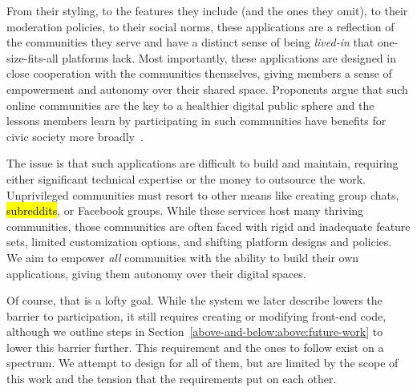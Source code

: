 
%
From their styling, to the features they include (and the ones they omit),
to their moderation policies, to their social norms, these applications
are a reflection of the communities they serve and have a
distinct sense of being \emph{lived-in}
that one-size-fits-all platforms lack.
Most importantly, these applications are designed in close cooperation with the communities themselves,
giving members a sense of empowerment and autonomy over their shared space.
Proponents argue that such online communities are the key to a healthier
digital public sphere and the lessons members learn by participating in such
communities have benefits for civic society more broadly~\cite{threeleggedstool, runyourownsocial, archiveoftheirown}.

The issue is that such applications are difficult to build and maintain,
requiring either significant technical expertise or the money to outsource the work.
Unprivileged communities must resort to other means like creating group chats,
\hl{subreddits}, or Facebook groups. %
While these services host many thriving communities,
those communities are often faced with rigid and inadequate feature sets,
limited customization options, and shifting platform designs and policies.
We aim to empower \emph{all} communities with the ability to
build their own applications, giving them autonomy over their digital spaces.

Of course, that is a lofty goal. While the system
we later describe lowers the barrier to participation,
it still requires creating or modifying front-end code, although
we outline steps in Section~\ref{above-and-below:above:future-work}
to lower this barrier further.
This requirement and the ones to follow exist on a spectrum.
We attempt to design for all of them, but are limited by
the scope of this work and the tension that the requirements put
on each other.




